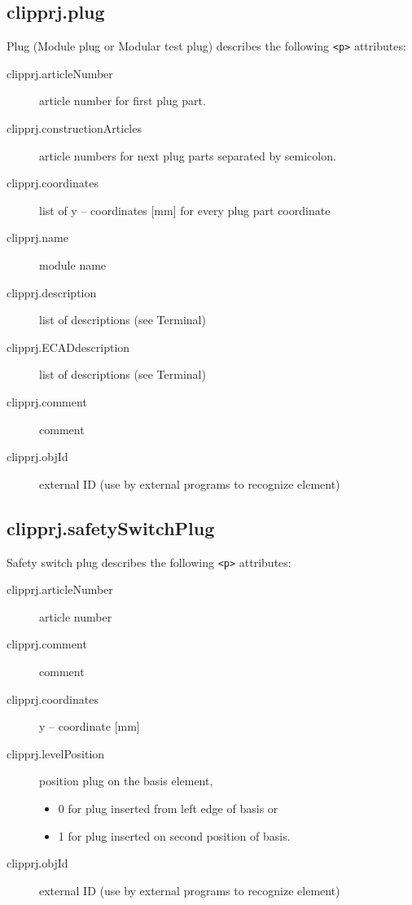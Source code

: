 \documentclass[%
	a4paper,
	oneside,
	listof=numbered,
	parskip=half,
	headsepline=true,
	footsepline=false,
	normalheadings,
	0.7headlines,
	headexclude,
	]{scrbook}
\begin{document}
\subsection{clipprj.plug}
 
Plug (Module plug or Modular test plug) describes the following \verb|<p>| attributes: 

\begin{description}
	\item[clipprj.articleNumber] article number for first plug part. 
	\item[clipprj.constructionArticles] article numbers for next plug parts separated by semicolon. 
	\item[clipprj.coordinates] list of y – coordinates [mm] for every plug part coordinate
	\item[clipprj.name] module name 
	\item[clipprj.description] list of descriptions (see Terminal) 
	\item[clipprj.ECADdescription] list of descriptions (see Terminal) 
	\item[clipprj.comment] comment 
	\item[clipprj.objId] external ID (use by external programs to recognize element) 
\end{description}

\subsection{clipprj.safetySwitchPlug}
 
Safety switch plug describes the following \verb|<p>| attributes: 

\begin{description}
	\item[clipprj.articleNumber] article number 
	\item[clipprj.comment] comment 
	\item[clipprj.coordinates] y – coordinate [mm] 
	\item[clipprj.levelPosition] position plug on the basis element,
	\begin{itemize}
		\item 0 for plug inserted from left edge of basis or
		\item 1 for plug inserted on second position of basis.
	\end{itemize} 
	\item[clipprj.objId] external ID (use by external programs to recognize element) 
\end{description}
\end{document}
